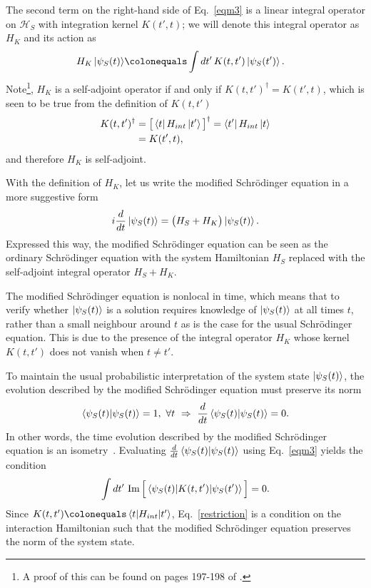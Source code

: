 \documentclass[a4paper,twocolumn,superscriptaddress,11pt,accepted=2019-06-04]{quantumarticle}
\newcommand{\ce}{\colonequals}
\renewcommand{\Im}{\mathop{\rm Im}}	%
\newcommand{\nn}{\nonumber}		%
\begin{document}
{The second term on the right-hand side of Eq.~\eqref{eqm3} is a linear integral operator on $\mathcal{H}_S$ with integration kernel $K(t',t)$; we will denote this integral operator as {$H_K$ and its action as}
\begin{align}
 H_K  \ket{\psi_S(t)} &\ce  \int dt' \, K(t,t')  \ket{\psi_S(t')}. \nn
\end{align}
Note\footnote{A proof of this can be found on pages 197-198 of \cite{Yosida:1980}.}, $H_K$ is a self-adjoint operator if and only if $K(t,t')^\dagger = K(t',t)$, which is seen to be true from the definition of $K(t,t')$
\begin{align}
K(t,t')^\dagger &=  \big[ \bra{t} H_{int} \ket{t'}\big]^\dagger =  \bra{t'} H_{int} \ket{t} \nn \\
&= K(t',t), \nn
\end{align}
and therefore $H_K$ is self-adjoint.

With the definition of $H_K$, let us write the modified Schr\"{o}dinger equation in a more suggestive form
\begin{align}
i \frac{d}{dt} \ket{\psi_S(t)} = \big( H_S +  H_K  \big) \ket{\psi_S(t)}. \nn %
\end{align}
Expressed this way, the modified Schr\"{o}dinger equation can be seen as the ordinary Schr\"{o}dinger equation with the system Hamiltonian $H_S$ replaced with the self-adjoint integral operator $H_S+ H_K$.

The modified Schr\"{o}dinger equation is nonlocal in time, which means that to verify whether $\ket{\psi_S(t)}$ is a solution requires knowledge of $\ket{\psi_S(t)}$ at all times $t$, rather than a small neighbour around $t$ as is the case for the usual Schr\"{o}dinger equation. This is due to the presence of the integral operator $H_K$ whose kernel $K(t,t')$ does not vanish when $t \neq t'$.

To maintain the usual probabilistic interpretation of the system state $\ket{\psi_S(t)}$, the evolution described by the modified Schr\"{o}dinger equation must preserve its norm
\begin{align}
 \braket{\psi_S(t) | \psi_S(t)} =1,  \ \forall t \ \Rightarrow \  \frac{d}{dt} \braket{\psi_S(t) | \psi_S(t)} = 0. \nn %
\end{align}
In other words, the time evolution described by the modified Schr\"{o}dinger equation is an isometry~{\cite{Busch:1999}}. Evaluating $\frac{d}{dt} \braket{\psi_S(t) | \psi_S(t)}$ using Eq.~\eqref{eqm3} yields the condition
\begin{align}
 \int dt' \, \Im \Big[ \braket{ \psi_S(t) | K(t,t')  | \psi_S(t')}   \Big] =0. \label{restriction}
\end{align}
Since $K(t,t')\ce\braket{t| H_{int} |t'}$, Eq.~\eqref{restriction} is a condition on the interaction Hamiltonian such that the modified Schr\"{o}dinger equation preserves the norm of the system state.

}
\end{document}
